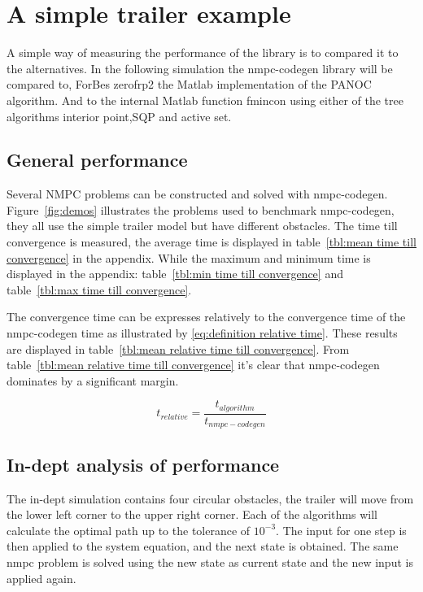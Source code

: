 \section{A simple trailer example}
A simple way of measuring the performance of the library is to compared it to the alternatives. In the following simulation the nmpc-codegen library will be compared to, ForBes zerofrp2 the Matlab implementation of the PANOC algorithm. And to the internal Matlab function fmincon using either of the tree algorithms interior point,SQP and active set.

\subsection{General performance}
Several NMPC problems can be constructed and solved with nmpc-codegen. Figure~\ref{fig:demos} illustrates the problems used to benchmark nmpc-codegen, they all use the simple trailer model but have different obstacles. The time till convergence is measured, the average time is displayed in table~\ref{tbl:mean time till convergence} in the appendix. While the maximum and minimum time is displayed in the appendix: table~\ref{tbl:min time till convergence} and table~\ref{tbl:max time till convergence}.

The convergence time can be expresses relatively to the convergence time of the nmpc-codegen time as illustrated by \eqref{eq:definition relative time}. These results are displayed in table~\ref{tbl:mean relative time till convergence}. From table~\ref{tbl:mean relative time till convergence} it's clear that nmpc-codegen dominates by a significant margin.

\begin{equation}
	t_{relative} = \frac{t_{algorithm}}{t_{nmpc-codegen}}
	\label{eq:definition relative time}
\end{equation}

\subsection{In-dept analysis of performance}
The in-dept simulation contains four circular obstacles, the trailer will move from the lower left corner to the upper right corner. Each of the algorithms will calculate the optimal path up to the tolerance of $10^{-3}$. The input for one step is then applied to the system equation, and the next state is obtained. The same nmpc problem is solved using the new state as current state  and the new input is applied again.

